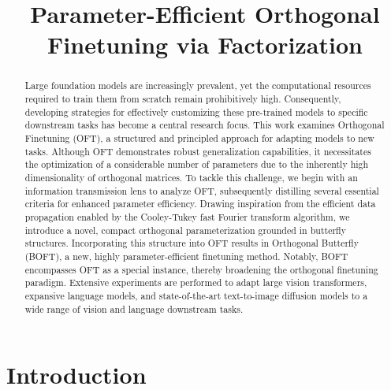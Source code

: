 \title{Parameter-Efficient Orthogonal Finetuning via Factorization}

\begin{abstract}
Large foundation models are increasingly prevalent, yet the computational resources required to train them from scratch remain prohibitively high. Consequently, developing strategies for effectively customizing these pre-trained models to specific downstream tasks has become a central research focus. This work examines Orthogonal Finetuning (OFT), a structured and principled approach for adapting models to new tasks. Although OFT demonstrates robust generalization capabilities, it necessitates the optimization of a considerable number of parameters due to the inherently high dimensionality of orthogonal matrices. To tackle this challenge, we begin with an information transmission lens to analyze OFT, subsequently distilling several essential criteria for enhanced parameter efficiency. Drawing inspiration from the efficient data propagation enabled by the Cooley-Tukey fast Fourier transform algorithm, we introduce a novel, compact orthogonal parameterization grounded in butterfly structures. Incorporating this structure into OFT results in Orthogonal Butterfly (BOFT), a new, highly parameter-efficient finetuning method. Notably, BOFT encompasses OFT as a special instance, thereby broadening the orthogonal finetuning paradigm. Extensive experiments are performed to adapt large vision transformers, expansive language models, and state-of-the-art text-to-image diffusion models to a wide range of vision and language downstream tasks.
\end{abstract}

\section{Introduction}

